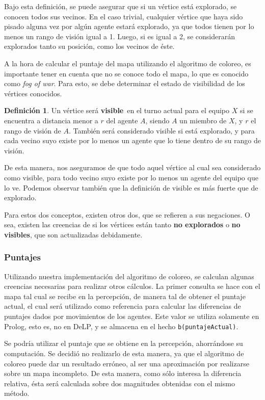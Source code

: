 \documentclass[oneside]{book}
\theoremstyle{definition}
\newtheorem{definicion}{Definición}[section]
\theoremstyle{example}
\begin{document}
Bajo esta definición, se puede asegurar que si un vértice está explorado, se 
conocen todos sus vecinos. En el caso trivial, cualquier vértice que haya sido
pisado alguna vez por algún agente estará explorado, ya que todos tienen por lo 
menos un rango de visión igual a 1. Luego, si es igual a 2, se considerarán
explorados tanto su posición, como los vecinos de éste.

A la hora de calcular el puntaje del mapa utilizando el algoritmo de coloreo,
es importante tener en cuenta que no se conoce todo el mapa, lo que es conocido 
como \textit{fog of war}. Para esto, se debe determinar el estado de visibilidad
de los vértices conocidos. 

\begin{definicion}
Un vértice será \textbf{visible}\ en el turno actual para el equipo $X$ si se 
encuentra a distancia 
menor a $r$ del agente $A$, siendo $A$ un miembro de $X$, y $r$ el rango de visión 
de $A$. También será considerado visible si está explorado, y para cada vecino suyo 
existe por lo menos un agente que lo tiene dentro de su rango de visión.
\end{definicion}

De esta manera, nos aseguramos de que todo aquel vértice al cual sea considerado 
como visible, para todo vecino suyo existe por lo menos un agente del equipo 
que lo ve. Podemos observar también que la definición de visible es más fuerte que
de explorado.

Para estos dos conceptos, existen otros dos, que se refieren a sus negaciones. O 
sea, existen las creencias de si los vértices están tanto \textbf{no explorados}
o \textbf{no visibles}, que son actualizadas debidamente.


\subsubsection{Puntajes}

Utilizando nuestra implementación del algoritmo de coloreo, se calculan algunas
creencias necesarias para realizar otros cálculos. La primer consulta se hace con
el mapa tal cual se recibe en la percepción, de manera tal de obtener el puntaje
actual, el cual será utilizado como referencia para calcular las diferencias de
puntajes dados por movimientos de los agentes. Este valor se utiliza solamente
en Prolog, esto es, no en DeLP, y se almacena en el hecho \texttt{b(puntajeActual)}.

Se podría utilizar el puntaje que se obtiene en la percepción, ahorrándose
su computación. Se decidió no realizarlo de esta manera, ya que el algoritmo de 
coloreo puede dar un resultado erróneo, al ser una aproximación por realizarse
sobre un mapa incompleto. De esta manera, como sólo interesa la diferencia 
relativa, ésta será calculada sobre dos magnitudes obtenidas con el mismo 
método.
\end{document}
